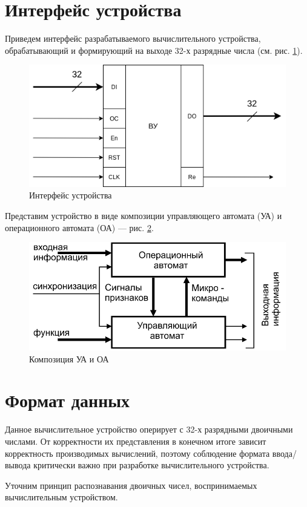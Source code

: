 \documentclass[a4paper,14pt]{extarticle}
\begin{document}
\section{Интерфейс устройства}
\label{sec:interface}
Приведем интерфейс разрабатываемого вычислительного устройства, обрабатывающий и формирующий на выходе 32-х разрядные числа (см. рис. \ref{fig:courseinterface}).
\begin{figure}[h!]
	\centering
	\includegraphics[width=0.7\linewidth]{images/course_interface}
	\caption{Интерфейс устройства}
	\label{fig:courseinterface}
\end{figure}
Представим устройство в виде композиции управляющего автомата (УА) и операционного автомата (ОА) --- рис. \ref{fig:courseinterfaceoama}.
\begin{figure}[h!]
	\centering
	\includegraphics[width=0.7\linewidth]{images/course_interface_oa_ma}
	\caption{Композиция УА и ОА}
	\label{fig:courseinterfaceoama}
\end{figure}


\section{Формат данных}
 Данное вычислительное устройство оперирует с 32-х разрядными двоичными числами. От корректности их представления в конечном итоге зависит корректность производимых вычислений, поэтому соблюдение формата ввода/вывода критически важно при разработке вычислительного устройства. 
 
 Уточним принцип распознавания двоичных чисел, воспринимаемых вычислительным устройством.
 
\end{document}

